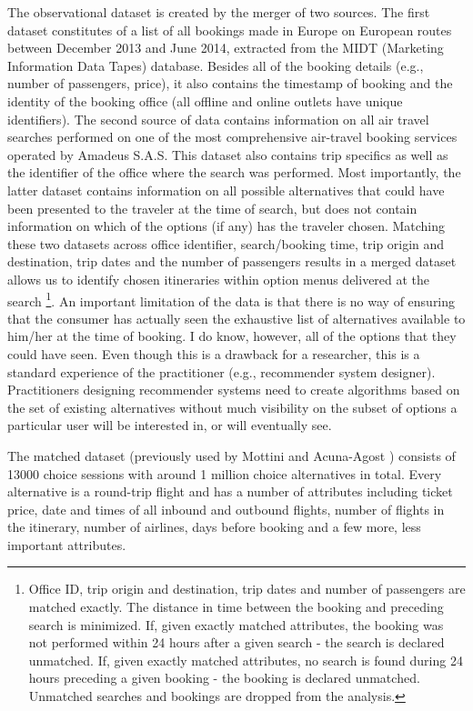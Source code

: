 \documentclass[a4paper,12pt]{article}
\newcommand{\citeyearonly}[1]{\citeyearpar{#1}}
\begin{document}
The observational dataset is created by the merger of two sources. The first dataset constitutes of a list of all bookings made in Europe on European routes between December 2013 and June 2014, extracted from the MIDT (Marketing Information Data Tapes) database. Besides all of the booking details (e.g., number of passengers, price), it also contains the timestamp of booking and the identity of the booking office (all offline and online outlets have unique identifiers). The second source of data contains information on all air travel searches performed on one of the most comprehensive air-travel booking services operated by Amadeus S.A.S. This dataset also contains trip specifics as well as the identifier of the office where the search was performed. Most importantly, the latter dataset contains information on all possible alternatives that could have been presented to the traveler at the time of search, but does not contain information on which of the options (if any) has the traveler chosen. Matching these two datasets across office identifier, search/booking time, trip origin and destination, trip dates and the number of passengers results in a merged dataset allows us to identify chosen itineraries within option menus delivered at the search \footnote{Office ID, trip origin and destination, trip dates and number of passengers are matched exactly. The distance in time between the booking and preceding search is minimized. If, given exactly matched attributes, the booking was not performed within 24 hours after a given search - the search is declared unmatched. If, given exactly matched attributes, no search is found during 24 hours preceding a given booking - the booking is declared unmatched. Unmatched searches and bookings are dropped from the analysis.}.  An important limitation of the data is that there is no way of ensuring that the consumer has actually seen the exhaustive list of alternatives available to him/her at the time of booking. I do know, however, all of the options that they could have seen. Even though this is a drawback for a researcher, this is a standard experience of the practitioner (e.g., recommender system designer). Practitioners designing recommender systems need to create algorithms based on the set of existing alternatives without much visibility on the subset of options a particular user will be interested in, or will eventually see.

The matched dataset (previously used by Mottini and Acuna-Agost \citeyearonly{mottiniAcunaAgost17}) consists of 13000 choice sessions with around 1 million choice alternatives in total. Every alternative is a round-trip flight and has a number of attributes including ticket price, date and times of all inbound and outbound flights, number of flights in the itinerary, number of airlines, days before booking and a few more, less important attributes.
\end{document}
